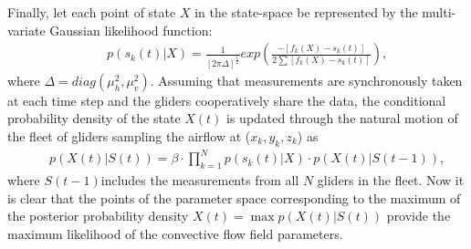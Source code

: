 \documentclass{ifacconf}
\begin{document}
Finally, let each point of state $X$ in the state-space be represented by the
multi-variate Gaussian likelihood function:
\begin{eqnarray*}
    && p(s_k(t)\vert X)=\frac{1}{[2\pi \Delta]^\frac{1}{2}}  exp( \frac{-[f_k(X)-s_k(t)]}{2 \sum
    [f_k(X)-s_k(t)] }),
    \label{eq:BayesLikeLH}
\end{eqnarray*}
where $\Delta=diag(\mu^2_h,\mu^2_v)$. Assuming that measurements are synchronously taken at each time step and the gliders cooperatively share the data, the conditional probability density of the state $X(t)$ is updated through the natural motion of the fleet of gliders sampling the airflow at ($x_k,y_k,z_k$) as
\begin{eqnarray}
    && p(X(t)\vert S(t))=\beta \cdot \prod_{k=1}^N p(s_k(t) \vert X)\cdot p(X(t) \vert S(t-1)),
    \label{eq:PostProb}
\end{eqnarray}
where $S(t-1)$includes the measurements from all $N$ gliders in the fleet.
Now it is clear that the points of the parameter space corresponding to the
maximum of the posterior probability density $X(t)=\max p(X(t) \vert S(t))$ provide the maximum likelihood of the convective flow field parameters.
%
\end{document}

